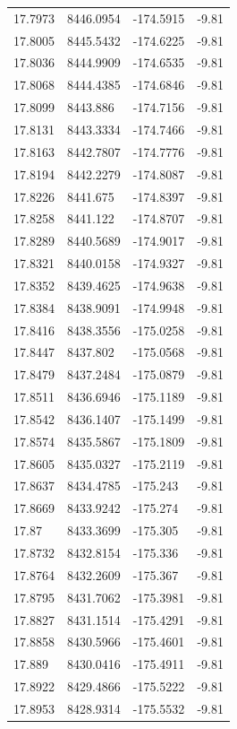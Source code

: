 \begin{table}[H]
\begin{tabular}{llll}
17.7973 & 8446.0954 & -174.5915 & -9.81 \\
17.8005 & 8445.5432 & -174.6225 & -9.81 \\
17.8036 & 8444.9909 & -174.6535 & -9.81 \\
17.8068 & 8444.4385 & -174.6846 & -9.81 \\
17.8099 & 8443.886 & -174.7156 & -9.81 \\
17.8131 & 8443.3334 & -174.7466 & -9.81 \\
17.8163 & 8442.7807 & -174.7776 & -9.81 \\
17.8194 & 8442.2279 & -174.8087 & -9.81 \\
17.8226 & 8441.675 & -174.8397 & -9.81 \\
17.8258 & 8441.122 & -174.8707 & -9.81 \\
17.8289 & 8440.5689 & -174.9017 & -9.81 \\
17.8321 & 8440.0158 & -174.9327 & -9.81 \\
17.8352 & 8439.4625 & -174.9638 & -9.81 \\
17.8384 & 8438.9091 & -174.9948 & -9.81 \\
17.8416 & 8438.3556 & -175.0258 & -9.81 \\
17.8447 & 8437.802 & -175.0568 & -9.81 \\
17.8479 & 8437.2484 & -175.0879 & -9.81 \\
17.8511 & 8436.6946 & -175.1189 & -9.81 \\
17.8542 & 8436.1407 & -175.1499 & -9.81 \\
17.8574 & 8435.5867 & -175.1809 & -9.81 \\
17.8605 & 8435.0327 & -175.2119 & -9.81 \\
17.8637 & 8434.4785 & -175.243 & -9.81 \\
17.8669 & 8433.9242 & -175.274 & -9.81 \\
17.87 & 8433.3699 & -175.305 & -9.81 \\
17.8732 & 8432.8154 & -175.336 & -9.81 \\
17.8764 & 8432.2609 & -175.367 & -9.81 \\
17.8795 & 8431.7062 & -175.3981 & -9.81 \\
17.8827 & 8431.1514 & -175.4291 & -9.81 \\
17.8858 & 8430.5966 & -175.4601 & -9.81 \\
17.889 & 8430.0416 & -175.4911 & -9.81 \\
17.8922 & 8429.4866 & -175.5222 & -9.81 \\
17.8953 & 8428.9314 & -175.5532 & -9.81 \\

\end{tabular}
\end{table}
